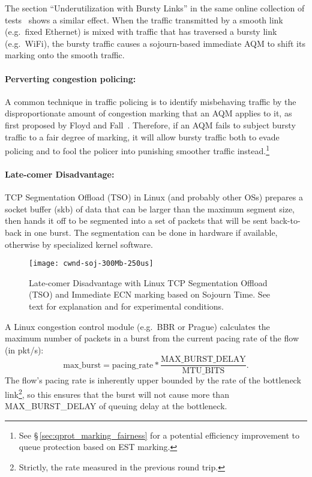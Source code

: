 The section ``Underutilization with Bursty Links'' in the same online collection of tests~\cite{Heist20:L4S_tests} shows a similar effect. When the traffic transmitted by a smooth link (e.g.\ fixed Ethernet) is mixed with traffic that has traversed a bursty link (e.g.\ WiFi), the bursty traffic causes a sojourn-based immediate AQM to shift its marking onto the smooth traffic.

\paragraph{Perverting congestion policing:} A common technique in traffic policing is to identify misbehaving traffic by the disproportionate amount of congestion marking that an AQM applies to it, as first proposed by Floyd and Fall~\cite{Floyd99:Penalty_box}. Therefore, if an AQM fails to subject bursty traffic to a fair degree of marking, it will allow bursty traffic both to evade policing and to fool the policer into punishing smoother traffic instead.\footnote{See \S\,\ref{sec:qprot_marking_fairness} for a potential efficiency improvement to queue protection based on EST marking.}

\paragraph{Late-comer Disadvantage:}\label{sec:late-comer-problem} TCP Segmentation Offload (TSO) in Linux (and probably other OSs) prepares a socket buffer (skb) of data that can be larger than the maximum segment size, then hands it off to be segmented into a set of packets that will be sent back-to-back in one burst. The segmentation can be done in hardware if available, otherwise by specialized kernel software.
\begin{figure}
	\centering
	\texttt{[image: cwnd-soj-300Mb-250us]}
	\caption{Late-comer Disadvantage with Linux TCP Segmentation Offload (TSO) and Immediate ECN marking based on Sojourn Time. See text for explanation and for experimental conditions.}\label{fig:cwnd-soj-300Mb-250us}
\end{figure}

A Linux congestion control module (e.g.\ BBR or Prague) calculates the maximum number of packets in a burst from the current pacing rate of the flow (in pkt/s):
\[\mathrm{max\_burst} = \mathrm{pacing\_rate} * \frac{\mathrm{MAX\_BURST\_DELAY}}{\mathrm{MTU\_BITS}}.\]
The flow's pacing rate is inherently upper bounded by the rate of the bottleneck link\footnote{Strictly, the rate measured in the previous round trip.}, so this ensures that the burst will not cause more than MAX\_BURST\_DELAY of queuing delay at the bottleneck.

